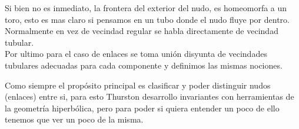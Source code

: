 Si bien no es inmediato, la frontera del exterior del nudo, es homeomorfa a un toro, esto es mas claro si pensamos en un tubo donde el nudo fluye por dentro. Normalmente en vez de vecindad regular se habla directamente de vecindad tubular.\\

Por ultimo para el caso de enlaces se toma unión disyunta de vecindades tubulares adecuadas para cada componente y definimos las mismas nociones.

Como siempre el propósito principal es clasificar y poder distinguir nudos (enlaces) entre si, para esto Thurston \cite{thurston_3d_geometry_topology} desarrollo invariantes con herramientas de la geometría hiperbólica, pero para poder si quiera entender un poco de ello tenemos que ver un poco de la misma.